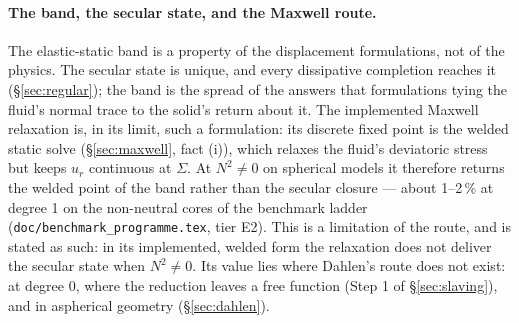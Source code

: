 \documentclass[11pt]{article}
\newcommand{\code}[1]{\texttt{#1}}
\begin{document}
\paragraph{The band, the secular state, and the Maxwell route.} The
elastic-static band is a property of the displacement formulations, not
of the physics. The secular state is unique, and every dissipative
completion reaches it (\S\ref{sec:regular}); the band is the spread of
the answers that formulations tying the fluid's normal trace to the
solid's return about it. The implemented Maxwell relaxation is, in its
limit, such a formulation: its discrete fixed point is the welded
static solve (\S\ref{sec:maxwell}, fact (i)), which relaxes the
fluid's deviatoric stress but keeps $u_r$ continuous at $\Sigma$. At
$N^2 \neq 0$ on spherical models it therefore returns the welded point
of the band rather than the secular closure --- about 1--2\,\% at
degree 1 on the non-neutral cores of the benchmark ladder
(\code{doc/benchmark\_programme.tex}, tier E2). This is a limitation of
the route, and is stated as such: in its implemented, welded form the
relaxation does not deliver the secular state when $N^2 \neq 0$. Its
value lies where Dahlen's route does not exist: at degree 0, where the
reduction leaves a free function (Step 1 of \S\ref{sec:slaving}), and
in aspherical geometry (\S\ref{sec:dahlen}).
\end{document}
